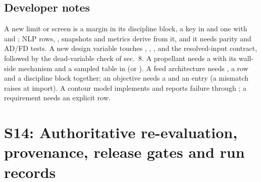 \subsection{Developer notes}\label{sec:s13-dev}
A new limit or screen is a margin in its discipline block, a key in  and one  with  and ; NLP rows, , snapshots and metrics derive from it, and it needs parity and AD/FD tests. A new design variable touches , , ,  and the resolved-input contract, followed by the dead-variable check of  sec.~8. A propellant needs a  with its wall-side mechanism and a sampled table in  (or ). A feed architecture needs , a  row and a discipline block together; an objective needs a  and an  entry (a mismatch raises at import). A contour model implements  and reports failure through ; a requirement needs an explicit  row.

\section{S14: Authoritative re-evaluation, provenance, release gates and run records}\label{sec:s14}


